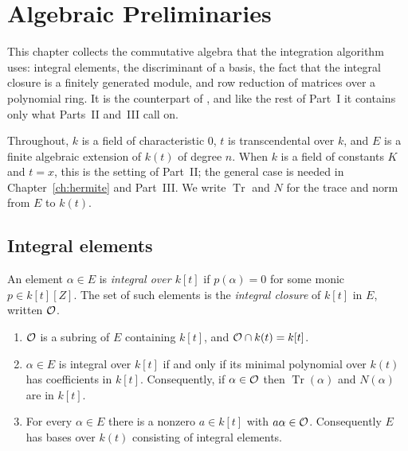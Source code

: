\chapter{Algebraic Preliminaries}\label{ch:preliminaries}

This chapter collects the commutative algebra that the integration algorithm
uses: integral elements, the discriminant of a basis, the fact that the
integral closure is a finitely generated module, and row reduction of matrices
over a polynomial ring. It is the counterpart of , and like the
rest of Part~I it contains only what Parts~II and~III call on.

Throughout, $k$ is a field of characteristic $0$, $t$ is transcendental over
$k$, and $E$ is a finite algebraic extension of $k(t)$ of degree $n$. When $k$
is a field of constants $K$ and $t = x$, this is the setting of Part~II; the
general case is needed in Chapter~\ref{ch:hermite} and Part~III. We write
$\operatorname{Tr}$ and $N$ for the trace and norm from $E$ to $k(t)$.

\section{Integral elements}\label{sec:prelim-integral}

An element $\alpha \in E$ is \emph{integral over $k[t]$} if $p(\alpha) = 0$ for
some monic $p \in k[t][Z]$. The set of such elements is the \emph{integral
closure} of $k[t]$ in $E$, written $\mathcal{O}$.

\begin{proposition}\label{prop:integral-basics}
\begin{enumerate}[label=\textup{(\roman*)}]
\item $\mathcal{O}$ is a subring of $E$ containing $k[t]$, and $\mathcal{O} \cap k(t) = k[t]$.
\item $\alpha \in E$ is integral over $k[t]$ if and only if its minimal
  polynomial over $k(t)$ has coefficients in $k[t]$. Consequently, if $\alpha
  \in \mathcal{O}$ then $\operatorname{Tr}(\alpha)$ and $N(\alpha)$ are in $k[t]$.
\item For every $\alpha \in E$ there is a nonzero $a \in k[t]$ with $a \alpha
  \in \mathcal{O}$. Consequently $E$ has bases over $k(t)$ consisting of integral
  elements.
\end{enumerate}
\end{proposition}

